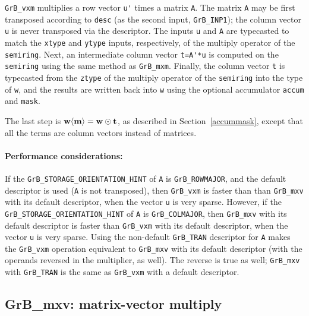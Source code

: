 \documentclass[12pt]{article}
\begin{document}
\verb'GrB_vxm' multiplies a row vector \verb"u'" times a matrix \verb'A'.  The
matrix \verb'A' may be first transposed according to \verb'desc' (as the second
input, \verb'GrB_INP1'); the column vector \verb'u' is never transposed via the
descriptor.  The inputs \verb'u' and \verb'A' are typecasted to match the
\verb'xtype' and \verb'ytype' inputs, respectively, of the multiply operator of
the \verb'semiring'.  Next, an intermediate column vector \verb"t=A'*u" is
computed on the \verb'semiring' using the same method as \verb'GrB_mxm'.
Finally, the column vector \verb't' is typecasted from the \verb'ztype' of the
multiply operator of the \verb'semiring' into the type of \verb'w', and the
results are written back into \verb'w' using the optional accumulator
\verb'accum' and \verb'mask'.

The last step is ${\bf w \langle m \rangle  = w \odot t}$, as described
in Section~\ref{accummask}, except that all the
terms are column vectors instead of matrices.

\paragraph{\bf Performance considerations:} %
If the \verb'GrB_STORAGE_ORIENTATION_HINT' of \verb'A' is \verb'GrB_ROWMAJOR', and the default
descriptor is used (\verb'A' is not transposed), then \verb'GrB_vxm' is faster
than than \verb'GrB_mxv' with its default descriptor, when the vector \verb'u'
is very sparse.
However, if the \verb'GrB_STORAGE_ORIENTATION_HINT' of \verb'A' is \verb'GrB_COLMAJOR', then
\verb'GrB_mxv' with its default descriptor is faster than \verb'GrB_vxm' with
its default descriptor, when the vector \verb'u' is very sparse.
Using the non-default \verb'GrB_TRAN' descriptor for \verb'A' makes the
\verb'GrB_vxm' operation equivalent to \verb'GrB_mxv' with its default
descriptor (with the operands reversed in the multiplier, as well).  The
reverse is true as well; \verb'GrB_mxv' with \verb'GrB_TRAN' is the same as
\verb'GrB_vxm' with a default descriptor.

\newpage
\subsection{{\sf GrB\_mxv:} matrix-vector multiply} %
\label{mxv}
\end{document}
